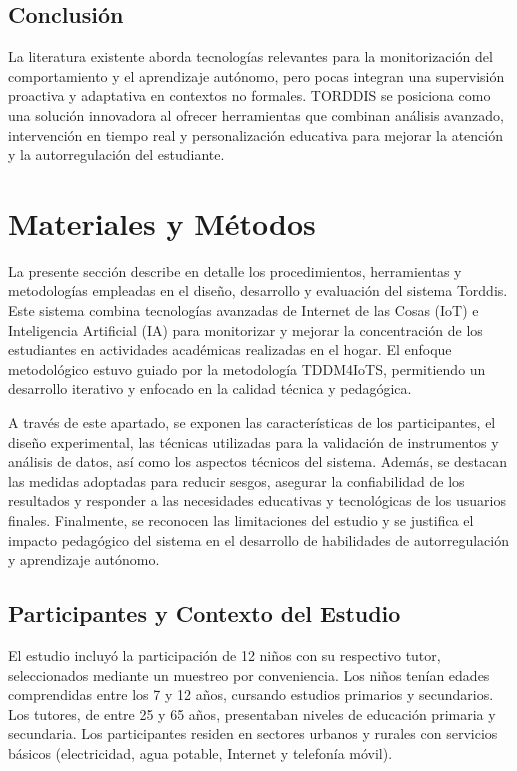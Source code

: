 \documentclass[a4paper,fleqn]{cas-sc}
\begin{document}
		\subsection{Conclusión}
			La literatura existente aborda tecnologías relevantes para la monitorización del comportamiento y el aprendizaje autónomo, pero pocas integran una supervisión proactiva y adaptativa en contextos no formales. TORDDIS se posiciona como una solución innovadora al ofrecer herramientas que combinan análisis avanzado, intervención en tiempo real y personalización educativa para mejorar la atención y la autorregulación del estudiante.
			
	\section{Materiales y Métodos}
	\label{seccion:Cuatro}
		La presente sección describe en detalle los procedimientos, herramientas y metodologías empleadas en el diseño, desarrollo y evaluación del sistema Torddis. Este sistema combina tecnologías avanzadas de Internet de las Cosas (IoT) e Inteligencia Artificial (IA) para monitorizar y mejorar la concentración de los estudiantes en actividades académicas realizadas en el hogar. El enfoque metodológico estuvo guiado por la metodología TDDM4IoTS, permitiendo un desarrollo iterativo y enfocado en la calidad técnica y pedagógica.
		
		A través de este apartado, se exponen las características de los participantes, el diseño experimental, las técnicas utilizadas para la validación de instrumentos y análisis de datos, así como los aspectos técnicos del sistema. Además, se destacan las medidas adoptadas para reducir sesgos, asegurar la confiabilidad de los resultados y responder a las necesidades educativas y tecnológicas de los usuarios finales. Finalmente, se reconocen las limitaciones del estudio y se justifica el impacto pedagógico del sistema en el desarrollo de habilidades de autorregulación y aprendizaje autónomo.
		
		\subsection{Participantes y Contexto del Estudio}
			El estudio incluyó la participación de 12 niños con su respectivo tutor, seleccionados mediante un muestreo por conveniencia. Los niños tenían edades comprendidas entre los 7 y 12 años, cursando estudios primarios y secundarios. Los tutores, de entre 25 y 65 años, presentaban niveles de educación primaria y secundaria. Los participantes residen en sectores urbanos y rurales con servicios básicos (electricidad, agua potable, Internet y telefonía móvil).
			
\end{document}
